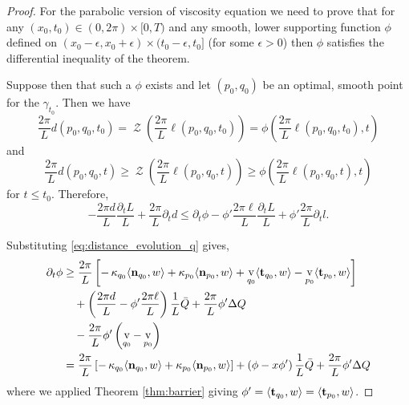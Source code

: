 \documentclass[11pt]{amsart}
\DeclareMathOperator{\tangspeed}{v}
\DeclareMathOperator{\chordarcprofile}{\mathcal{Z}}
\begin{document}
\begin{proof}
For the parabolic version of viscosity equation we need to prove that for any $(x_0, t_0) \in (0, 2\pi) \times [0, T)$ and any smooth, lower supporting function $\phi$ defined on $(x_0 -\epsilon, x_0 + \epsilon) \times (t_0 - \epsilon, t_0]$ (for some $\epsilon > 0$) then $\phi$ satisfies the differential inequality of the theorem.

Suppose then that such a $\phi$ exists and let $(p_0, q_0)$ be an optimal, smooth point for the $\gamma_{t_0}$. Then we have
\[
\frac{2\pi}{L} d(p_0, q_0, t_0) = \chordarcprofile\left(\frac{2\pi}{L} \ell(p_0, q_0, t_0)\right) = \phi\left(\frac{2\pi}{L} \ell(p_0, q_0, t_0), t\right)
\]
and
\[
\frac{2\pi}{L} d(p_0, q_0, t) \geq \chordarcprofile\left(\frac{2\pi}{L} \ell(p_0, q_0, t)\right) \geq \phi\left(\frac{2\pi}{L} \ell(p_0, q_0, t), t\right)
\]
for $t \leq t_0$. Therefore,
\[
- \frac{2\pi d}{L} \frac{\partial_t L}{L} + \frac{2\pi}{L} \partial_t d \leq \partial_t \phi - \phi' \frac{2\pi \ell}{L} \frac{\partial_t L}{L} +\phi' \frac{2\pi}{L} \partial_t l.
\]

Substituting \eqref{eq:distance_evolution_q} gives,
\begin{equation}
\label{eq:time_ineq}
\begin{split}
\partial_t \phi &\geq \frac{2\pi}{L} \left[-\curvecurv_{q_0} \ip{\nor_{q_0}}{w} + \curvecurv_{p_0} \ip{\nor_{p_0}}{w} + \tangspeed_{q_0} \ip{\tang_{q_0}}{w} - \tangspeed_{p_0} \ip{\tang_{p_0}}{w}\right] \\
&\quad + \left(\frac{2\pi d}{L} - \phi' \frac{2\pi \ell}{L}\right) \frac{1}{L} \bar{Q} + \frac{2\pi}{L} \phi' \Delta Q \\
&\quad - \frac{2\pi}{L} \phi' \left(\tangspeed_{q_0} - \tangspeed_{p_0}\right) \\
&= \frac{2\pi}{L} \left[-\curvecurv_{q_0} \ip{\nor_{q_0}}{w} + \curvecurv_{p_0} \ip{\nor_{p_0}}{w}\right] + \left(\phi - x \phi'\right) \frac{1}{L} \bar{Q} + \frac{2\pi}{L} \phi' \Delta Q
\end{split}
\end{equation}
where we applied Theorem \ref{thm:barrier} giving $\phi' = \langle{\operatorname{\mathbf{t}}_{q_0}},{w}\rangle = \langle{\operatorname{\mathbf{t}}_{p_0}},{w}\rangle$.


\end{proof}
\end{document}
